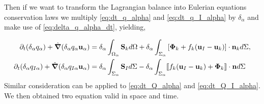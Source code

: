 Then if we want to transform the Lagrangian balance into Eulerian equations conservation laws we multiply \ref{eq:dt_q_alpha} and \ref{eq:dt_q_I_alpha} by $\delta_\alpha$ and make use of \ref{eq:delta_q_alpha_dt}, yielding,

\begin{align}
    \partial_t (\delta_\alpha q_\alpha)
    + \hat{\bm{\nabla}} (\delta_\alpha q_\alpha \textbf{u}_\alpha)
    &= \delta_\alpha\int_{\Omega_\alpha} \textbf{S}_k d\Omega
    + \delta_\alpha\int_{\Sigma_\alpha} \left[\bm{\Phi}_k + f_k (\textbf{u}_I-\textbf{u}_k) \right] \cdot \textbf{n}_k d\Sigma,
    \label{eq:dt_dq_alpha}\\
    \partial_t (\delta_\alpha q_{I\alpha})
    + \hat{\bm{\nabla}} (\delta_\alpha q_{I\alpha} \textbf{u}_\alpha)
    &= \delta_\alpha\int_{\Sigma_\alpha} 
        \textbf{S}_I
    d\Sigma
    - \delta_\alpha\int_{\Sigma_\alpha} \llbracket 
        f_k (\textbf{u}_I - \textbf{u}_k)
        + \mathbf{\Phi}_k
     \rrbracket \cdot \textbf{n}
    d\Sigma
    \label{eq:dt_dq_I_alpha}
\end{align}
Similar consideration can be applied to \ref{eq:dt_Q_alpha} and \ref{eq:dt_Q_I_alpha}.
We then obtained two equation valid in space and time. 
